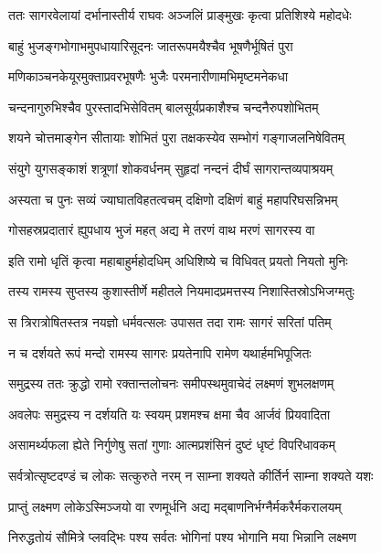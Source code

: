 
\twolineshloka
{ततः सागरवेलायां दर्भानास्तीर्य राघवः}
{अञ्जलिं प्राङ्मुखः कृत्वा प्रतिशिश्ये महोदधेः} %

\twolineshloka
{बाहुं भुजङ्गभोगाभमुपधायारिसूदनः}
{जातरूपमयैश्चैव भूषणैर्भूषितं पुरा} %

\twolineshloka
{मणिकाञ्चनकेयूरमुक्ताप्रवरभूषणैः}
{भुजैः परमनारीणामभिमृष्टमनेकधा} %

\twolineshloka
{चन्दनागुरुभिश्चैव पुरस्तादभिसेवितम्}
{बालसूर्यप्रकाशैश्च चन्दनैरुपशोभितम्} %

\twolineshloka
{शयने चोत्तमाङ्गेन सीतायाः शोभितं पुरा}
{तक्षकस्येव सम्भोगं गङ्गाजलनिषेवितम्} %

\twolineshloka
{संयुगे युगसङ्काशं शत्रूणां शोकवर्धनम्}
{सुहृदां नन्दनं दीर्घं सागरान्तव्यपाश्रयम्} %

\twolineshloka
{अस्यता च पुनः सव्यं ज्याघातविहतत्वचम्}
{दक्षिणो दक्षिणं बाहुं महापरिघसन्निभम्} %

\twolineshloka
{गोसहस्रप्रदातारं ह्युपधाय भुजं महत्}
{अद्य मे तरणं वाथ मरणं सागरस्य वा} %

\twolineshloka
{इति रामो धृतिं कृत्वा महाबाहुर्महोदधिम्}
{अधिशिष्ये च विधिवत् प्रयतो नियतो मुनिः} %

\twolineshloka
{तस्य रामस्य सुप्तस्य कुशास्तीर्णे महीतले}
{नियमादप्रमत्तस्य निशास्तिस्रोऽभिजग्मतुः} %

\twolineshloka
{स त्रिरात्रोषितस्तत्र नयज्ञो धर्मवत्सलः}
{उपासत तदा रामः सागरं सरितां पतिम्} %

\twolineshloka
{न च दर्शयते रूपं मन्दो रामस्य सागरः}
{प्रयतेनापि रामेण यथार्हमभिपूजितः} %

\twolineshloka
{समुद्रस्य ततः क्रुद्धो रामो रक्तान्तलोचनः}
{समीपस्थमुवाचेदं लक्ष्मणं शुभलक्षणम्} %

\twolineshloka
{अवलेपः समुद्रस्य न दर्शयति यः स्वयम्}
{प्रशमश्च क्षमा चैव आर्जवं प्रियवादिता} %

\twolineshloka
{असामर्थ्यफला ह्येते निर्गुणेषु सतां गुणाः}
{आत्मप्रशंसिनं दुष्टं धृष्टं विपरिधावकम्} %

\twolineshloka
{सर्वत्रोत्सृष्टदण्डं च लोकः सत्कुरुते नरम्}
{न साम्ना शक्यते कीर्तिर्न साम्ना शक्यते यशः} %

\twolineshloka
{प्राप्तुं लक्ष्मण लोकेऽस्मिञ्जयो वा रणमूर्धनि}
{अद्य मद्बाणनिर्भग्नैर्मकरैर्मकरालयम्} %

\twolineshloka
{निरुद्धतोयं सौमित्रे प्लवद्भिः पश्य सर्वतः}
{भोगिनां पश्य भोगानि मया भिन्नानि लक्ष्मण} %

